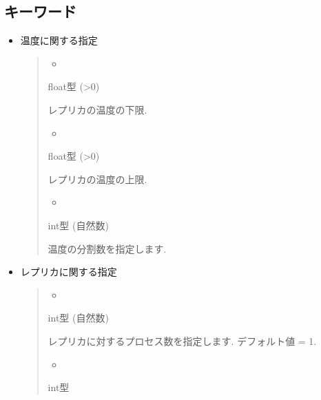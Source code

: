 \documentclass[letterpaper,10pt,dvipdfmx]{sphinxmanual}
\begin{document}
\subsection{キーワード}
\label{\detokenize{file_specification/parameter_replica:id2}}\begin{itemize}
\item {} 
温度に関する指定
\begin{quote}
\begin{itemize}
\item {} 

\end{itemize}

 float型 (\textgreater{}0)

レプリカの温度の下限.
\begin{itemize}
\item {} 

\end{itemize}

 float型 (\textgreater{}0)

レプリカの温度の上限.
\begin{itemize}
\item {} 

\end{itemize}

 int型 (自然数)

 温度の分割数を指定します.
\end{quote}

\item {} 
レプリカに関する指定
\begin{quote}
\begin{itemize}
\item {} 

\end{itemize}

 int型 (自然数)

 レプリカに対するプロセス数を指定します. デフォルト値 = 1.
\begin{itemize}
\item {} 

\end{itemize}

 int型


\end{quote}
\end{itemize}
\end{document}
